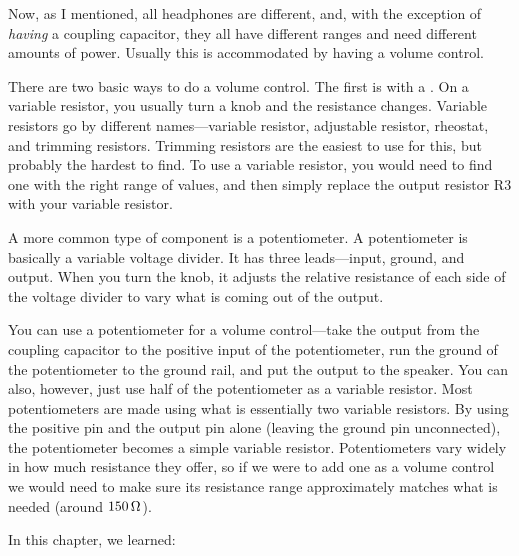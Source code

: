 Now, as I mentioned, all headphones are different, and, with the exception of \emph{having} a coupling capacitor, they all have different ranges and need different amounts of power.
Usually this is accommodated by having a volume control.

There are two basic ways to do a volume control.
The first is with a .
On a variable resistor, you usually turn a knob and the resistance changes.
Variable resistors go by different names---variable resistor, adjustable resistor, rheostat, and trimming resistors.
Trimming resistors are the easiest to use for this, but probably the hardest to find.
To use a variable resistor, you would need to find one with the right range of values, and then simply replace the output resistor R3 with your variable resistor.

A more common type of component is a potentiometer.
A potentiometer is basically a variable voltage divider.
It has three leads---input, ground, and output.
When you turn the knob, it adjusts the relative resistance of each side of the voltage divider to vary what is coming out of the output.

You can use a potentiometer for a volume control---take the output from the coupling capacitor to the positive input of the potentiometer, run the ground of the potentiometer to the ground rail, and put the output to the speaker.
You can also, however, just use half of the potentiometer as a variable resistor.
Most potentiometers are made using what is essentially two variable resistors.
By using the positive pin and the output pin alone (leaving the ground pin unconnected), the potentiometer becomes a simple variable resistor.
Potentiometers vary widely in how much resistance they offer, so if we were to add one as a volume control we would need to make sure its resistance range approximately matches what is needed (around $150\,\si{\ohm}$).


\reviewsection

In this chapter, we learned:

